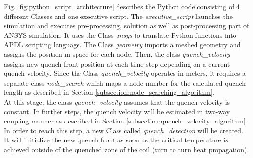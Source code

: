 Fig. \ref{fig:python_script_architecture} describes the Python code consisting of 4 different Classes and one executive script. The \textit{executive\_script} launches the simulation and executes pre-processing, solution as well as post-processing part of ANSYS simulation. It uses the Class \textit{ansys} to translate Python functions into APDL scripting language. The Class \textit{geometry} imports a meshed geometry and assigns the position in space for each node. Then, the class \textit{quench\_velocity} assigns new quench front position at each time step depending on a current quench velocity. Since the Class \textit{quench\_velocity} operates in meters, it requires a separate class \textit{node\_search} which maps a node number for the calculated quench length as described in Section \ref{subsection:node_searching_algorithm}.\\

At this stage, the class \textit{quench\_velocity} assumes that the quench velocity is constant. In further steps, the quench velocity will be estimated in two-way coupling manner as described in Section \ref{subsection:quench_velocity_algorithm}. In order to reach this step, a new Class called \textit{quench\_detection} will be created. It will initialize the new quench front as soon as the critical temperature is achieved outside of the quenched zone of the coil (turn to turn heat propagation).